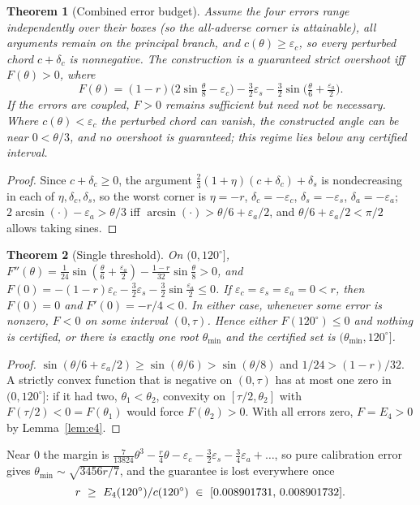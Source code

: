 \documentclass[11pt]{article}
\newtheorem{theorem}{Theorem}
\theoremstyle{definition}
\newcommand{\eps}{\varepsilon}
\begin{document}
\begin{theorem}[Combined error budget]\label{thm:multi}
Assume the four errors range independently over their boxes (so the all-adverse corner is attainable), all arguments remain on the principal branch, and $c(\theta)\ge\eps_c$, so every perturbed chord $c+\delta_c$ is nonnegative. The construction is a guaranteed strict overshoot iff $F(\theta)>0$, where
\[
F(\theta)=(1-r)\Big(2\sin\tfrac\theta8-\eps_c\Big)-\tfrac32\eps_s-\tfrac32\sin\!\Big(\tfrac\theta6+\tfrac{\eps_a}2\Big).
\]
If the errors are coupled, $F>0$ remains sufficient but need not be necessary. Where $c(\theta)<\eps_c$ the perturbed chord can vanish, the constructed angle can be near $0<\theta/3$, and no overshoot is guaranteed; this regime lies below any certified interval.
\end{theorem}
\begin{proof}
Since $c+\delta_c\ge0$, the argument $\tfrac23(1+\eta)(c+\delta_c)+\delta_s$ is nondecreasing in each of $\eta,\delta_c,\delta_s$, so the worst corner is $\eta=-r$, $\delta_c=-\eps_c$, $\delta_s=-\eps_s$, $\delta_a=-\eps_a$; $2\arcsin(\cdot)-\eps_a>\theta/3$ iff $\arcsin(\cdot)>\theta/6+\eps_a/2$, and $\theta/6+\eps_a/2<\pi/2$ allows taking sines.
\end{proof}

\begin{theorem}[Single threshold]\label{thm:convex}
On $(0,120^\circ]$, $F''(\theta)=\tfrac1{24}\sin(\tfrac\theta6+\tfrac{\eps_a}2)-\tfrac{1-r}{32}\sin\tfrac\theta8>0$, and $F(0)=-(1-r)\eps_c-\tfrac32\eps_s-\tfrac32\sin\tfrac{\eps_a}2\le0$. If $\eps_c=\eps_s=\eps_a=0<r$, then $F(0)=0$ and $F'(0)=-r/4<0$. In either case, whenever some error is nonzero, $F<0$ on some interval $(0,\tau)$. Hence either $F(120^\circ)\le0$ and nothing is certified, or there is exactly one root $\theta_{\min}$ and the certified set is $(\theta_{\min},120^\circ]$.
\end{theorem}
\begin{proof}
$\sin(\theta/6+\eps_a/2)\ge\sin(\theta/6)>\sin(\theta/8)$ and $1/24>(1-r)/32$. A strictly convex function that is negative on $(0,\tau)$ has at most one zero in $(0,120^\circ]$: if it had two, $\theta_1<\theta_2$, convexity on $[\tau/2,\theta_2]$ with $F(\tau/2)<0=F(\theta_1)$ would force $F(\theta_2)>0$. With all errors zero, $F=E_4>0$ by Lemma~\ref{lem:e4}.
\end{proof}

Near $0$ the margin is $\tfrac{7}{13824}\theta^3-\tfrac r4\theta-\eps_c-\tfrac32\eps_s-\tfrac34\eps_a+\dots$, so pure calibration error gives $\theta_{\min}\sim\sqrt{3456r/7}$, and the guarantee is lost everywhere once
\[ r\ \ge\ E_4(120^\circ)/c(120^\circ)\ \in\ [\RcapLo,\,\RcapHi]. \]
\end{document}

